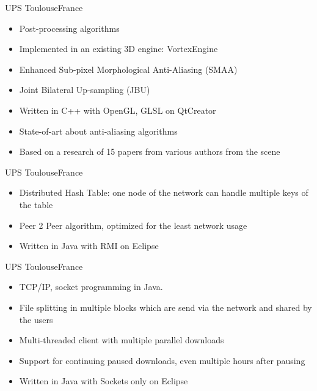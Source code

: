 \documentclass[a4paper,11pt]{moderncv}
\begin{document}
{UPS Toulouse}{France}
{
    \begin{itemize}
        \item Post-processing algorithms
        \item Implemented in an existing 3D engine: VortexEngine
        \item Enhanced Sub-pixel Morphological Anti-Aliasing (SMAA)
        \item Joint Bilateral Up-sampling (JBU)
        \item Written in C++ with OpenGL, GLSL on QtCreator
    \end{itemize}
    \begin{itemize}
        \item State-of-art about anti-aliasing algorithms
        \item Based on a research of 15 papers from various authors from the scene
    \end{itemize}
}

{UPS Toulouse}{France}
{
    \begin{itemize}
        \item Distributed Hash Table: one node of the network can handle multiple keys of the table
        \item Peer 2 Peer algorithm, optimized for the least network usage
        \item Written in Java with RMI on Eclipse
    \end{itemize}
}

{UPS Toulouse}{France}
{
    \begin{itemize}
        \item TCP/IP, socket programming in Java.
        \item File splitting in multiple blocks which are send via the network and shared by the users
        \item Multi-threaded client with multiple parallel downloads
        \item Support for continuing paused downloads, even multiple hours after pausing
        \item Written in Java with Sockets only on Eclipse
    \end{itemize}
}
\end{document}
